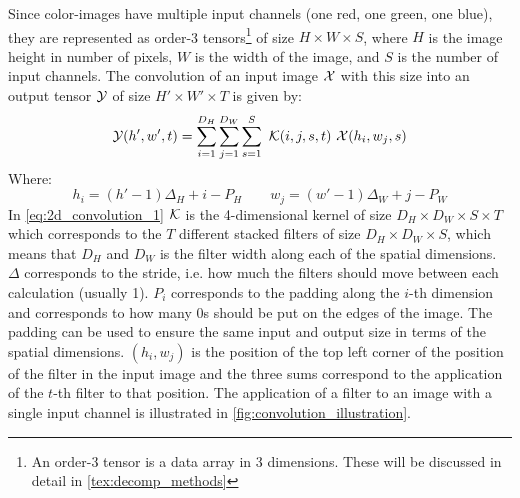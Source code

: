 Since color-images have multiple input channels (one red, one green, one blue), they are represented as order-3 tensors\footnote{An order-3 tensor is a data array in 3 dimensions. These will be discussed in detail in \autoref{tex:decomp_methods}} of size $H \times W \times S$, where $H$ is the image height in number of pixels, $W$ is the width of the image, and $S$ is the number of input channels. The convolution of an input image $\mathcal{X}$ with this size into an output tensor $\mathcal{Y}$ of size $H' \times W' \times T$ is given by:
\begin{equation}
    \mathcal{Y}(h', w', t) =\sum_{i=1}^{D_H} \sum_{j=1}^{D_W} \sum_{s=1}^{S} \ \mathcal{K}(i, j, s, t) \ \mathcal{X}(h_i, w_j, s)
    \label{eq:2d_convolution_1}
\end{equation}
Where:
\begin{equation}
    h_i =  \left(h' - 1\right) \Delta_H + i - P_H \qquad w_j =  \left(w' - 1\right) \Delta_W + j - P_W
\end{equation}
In \eqref{eq:2d_convolution_1} $\mathcal{K}$ is the 4-dimensional kernel of size $D_H \times D_W \times S \times T$ which corresponds to the $T$ different stacked filters of size $D_H \times D_W \times S$, which means that $D_H$ and $D_W$ is the filter width along each of the spatial dimensions. $\Delta$ corresponds to the stride, i.e. how much the filters should move between each calculation (usually 1). $P_i$ corresponds to the padding along the $i$-th dimension and corresponds to how many 0s should be put on the edges of the image. The padding can be used to ensure the same input and output size in terms of the spatial dimensions. $(h_i, w_j)$ is the position of the top left corner of the position of the filter in the input image and the three sums correspond to the application of the $t$-th filter to that position. The application of a filter to an image with a single input channel is illustrated in \autoref{fig:convolution_illustration}.
